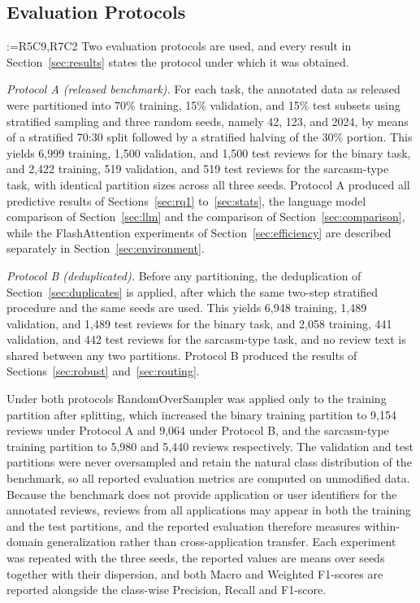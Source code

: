 \documentclass[a4paper,fleqn]{cas-sc}
\makeatletter
\newif\iftracked
\newcommand{\rv@setcolour}[1]{%
  \IfStrEq{#1}{R7C7}{\color{rvEdit}}{%
    \IfSubStr{#1}{R5}{\IfSubStr{#1}{R7}{\color{rvBoth}}{\color{rvFive}}}{\color{rvSeven}}}}
\newcommand{\rv@tag}[1]{\textsuperscript{\sffamily\bfseries\scriptsize[\StrSubstitute{#1}{,}{, }]}\,}
\newcommand{\rv@recordone}[1]{%
  \edef\rv@i{#1}%
  \ifcsdef{rv@n@\rv@i}{}{\csgdef{rv@n@\rv@i}{0}}%
  \csxdef{rv@n@\rv@i}{\the\numexpr\csuse{rv@n@\rv@i}+1\relax}%
  \begingroup\edef\@currentlabel{\rv@i}\label{rv:\rv@i:\csuse{rv@n@\rv@i}}\endgroup}
\newcommand{\rv@record}[1]{\@for\rv@id:=#1\do{\expandafter\rv@recordone\expandafter{\rv@id}}}
\DeclareRobustCommand{\rcx}[2]{\iftracked{\rv@setcolour{#1}\rv@tag{#1}#2}\else#2\fi}
\newenvironment{rcblock}[1]{\rv@record{#1}\iftracked\rv@setcolour{#1}\leavevmode\rv@tag{#1}\fi\ignorespaces}{\par}
\makeatother
\begin{document}
\subsection{\texorpdfstring{\rcx{R5C9,R7C2}{Evaluation Protocols}}{Evaluation Protocols}}
\label{sec:protocols}
\begin{rcblock}{R5C9,R7C2}
Two evaluation protocols are used, and every result in Section~\ref{sec:results} states the protocol under which it was obtained.

\textit{Protocol A (released benchmark).} For each task, the annotated data as released were partitioned into 70\% training, 15\% validation, and 15\% test subsets using stratified sampling and three random seeds, namely 42, 123, and 2024, by means of a stratified 70:30 split followed by a stratified halving of the 30\% portion. This yields 6,999 training, 1,500 validation, and 1,500 test reviews for the binary task, and 2,422 training, 519 validation, and 519 test reviews for the sarcasm-type task, with identical partition sizes across all three seeds. Protocol A produced all predictive results of Sections~\ref{sec:rq1} to~\ref{sec:stats}, the language model comparison of Section~\ref{sec:llm} and the comparison of Section~\ref{sec:comparison}, while the FlashAttention experiments of Section~\ref{sec:efficiency} are described separately in Section~\ref{sec:environment}.

\textit{Protocol B (deduplicated).} Before any partitioning, the deduplication of Section~\ref{sec:duplicates} is applied, after which the same two-step stratified procedure and the same seeds are used. This yields 6,948 training, 1,489 validation, and 1,489 test reviews for the binary task, and 2,058 training, 441 validation, and 442 test reviews for the sarcasm-type task, and no review text is shared between any two partitions. Protocol B produced the results of Sections~\ref{sec:robust} and~\ref{sec:routing}.

Under both protocols RandomOverSampler was applied only to the training partition after splitting, which increased the binary training partition to 9,154 reviews under Protocol A and 9,064 under Protocol B, and the sarcasm-type training partition to 5,980 and 5,440 reviews respectively. The validation and test partitions were never oversampled and retain the natural class distribution of the benchmark, so all reported evaluation metrics are computed on unmodified data. Because the benchmark does not provide application or user identifiers for the annotated reviews, reviews from all applications may appear in both the training and the test partitions, and the reported evaluation therefore measures within-domain generalization rather than cross-application transfer. Each experiment was repeated with the three seeds, the reported values are means over seeds together with their dispersion, and both Macro and Weighted F1-scores are reported alongside the class-wise Precision, Recall and F1-score.
\end{rcblock}
\end{document}
